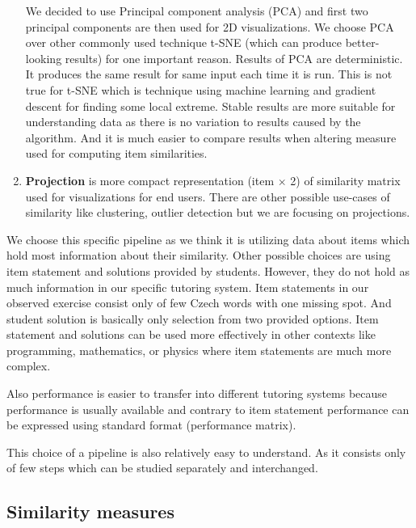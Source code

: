 \documentclass[
  digital, %
  table,   %
  nolof,     %
  nolot,     %
  nocover,
  color
]{fithesis3}
\begin{document}
\begin{enumerate}

    We decided to use Principal component analysis (PCA) and first two principal components are then used for 2D visualizations. We choose PCA over other commonly used technique t-SNE (which can produce better-looking results) for one important reason. Results of PCA are deterministic. It produces the same result for same input each time it is run. This is not true for t-SNE which is technique using machine learning and gradient descent for finding some local extreme. Stable results are more suitable for understanding data as there is no variation to results caused by the algorithm. And it is much easier to compare results when altering measure used for computing item similarities.

  \item
    \textbf{Projection} is more compact representation (item $\times$ 2) of similarity matrix used for visualizations for end users. There are other possible use-cases of similarity like clustering, outlier detection but we are focusing on projections.
\end{enumerate}


We choose this specific pipeline as we think it is utilizing data about items which hold most information about their similarity. Other possible choices are using item statement and solutions provided by students. However, they do not hold as much information in our specific tutoring system. Item statements in our observed exercise consist only of few Czech words with one missing spot. And student solution is basically only selection from two provided options. Item statement and solutions can be used more effectively in other contexts like programming, mathematics, or physics where item statements are much more complex.

Also performance is easier to transfer into different tutoring systems because performance is usually available and contrary to item statement performance can be expressed using standard format (performance matrix).

This choice of a pipeline is also relatively easy to understand. As it consists only of few steps which can be studied separately and interchanged.


\subsection{Similarity measures}\label{similarity-measures}
\end{document}

